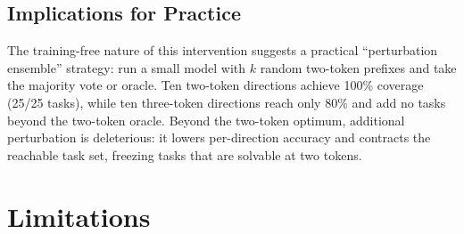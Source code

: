 \documentclass{article}
\begin{document}
\subsection{Implications for Practice}

The training-free nature of this intervention suggests a practical
``perturbation ensemble'' strategy: run a small model with $k$ random
two-token prefixes and take the majority vote or oracle. Ten two-token
directions achieve 100\% coverage (25/25 tasks), while ten three-token
directions reach only 80\% and add no tasks beyond the two-token
oracle. Beyond the two-token optimum, additional perturbation is
deleterious: it lowers per-direction accuracy and contracts the
reachable task set, freezing tasks that are solvable at two tokens.

\section{Limitations} %
\label{sec:limitations}
\end{document}
